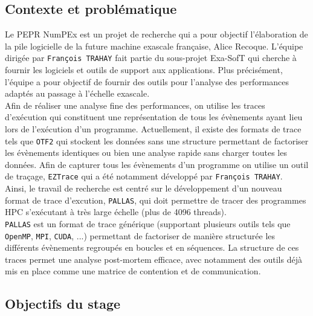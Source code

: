 

\subsection{Contexte et problématique}\label{ssec:introduction_contexte_problematique}

Le PEPR NumPEx est un projet de recherche qui a pour objectif l'élaboration de la pile logicielle de la future machine exascale française, Alice Recoque. L'équipe dirigée par \verb!François TRAHAY!
fait partie du sous-projet Exa-SofT qui cherche à fournir les logiciels et outils de support aux applications. Plus précisément, l'équipe a pour objectif de fournir des outils pour l'analyse des performances
adaptés au passage à l'échelle exascale. \\
Afin de réaliser une analyse fine des performances, on utilise les traces d'exécution qui constituent une représentation de tous les évènements ayant lieu lors de l'exécution d'un programme.
Actuellement, il existe des formats de trace tels que \verb!OTF2! qui stockent les données sans une structure permettant de factoriser les évènements identiques ou bien une analyse rapide sans charger toutes les données. 
Afin de capturer tous les évènements d'un programme on utilise un outil de traçage, \verb!EZTrace! qui a été notamment 
développé par \verb!François TRAHAY!.
\\Ainsi, le travail de recherche est centré sur le développement d'un nouveau format de trace d'excution, \verb!PALLAS!, qui doit permettre de tracer des programmes HPC s'exécutant à très large échelle
(plus de 4096 threads).\\
\verb!PALLAS! est un format de trace générique (supportant plusieurs outils tels que \verb!OpenMP!, \verb!MPI!, \verb!CUDA!, ...) permettant de factoriser de manière structurée les différents évènements 
regroupés en boucles et en séquences. La structure de ces traces permet une analyse post-mortem efficace, avec notamment des outils déjà mis en place comme une matrice
de contention et de communication.





\subsection{Objectifs du stage}\label{ssec:introduction_objectifs}

